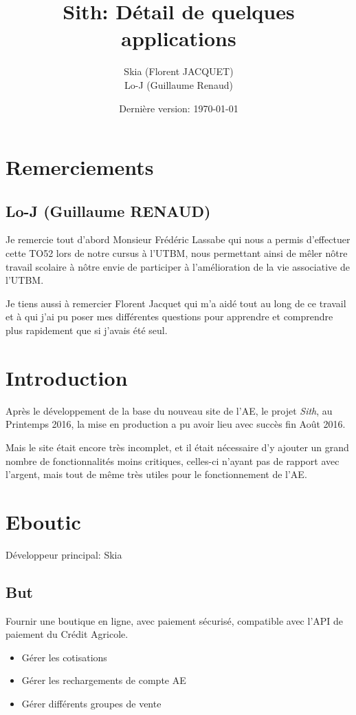 \documentclass[a4paper]{report}
\title{Sith: Détail de quelques applications}
\author{Skia (Florent JACQUET)\\
Lo-J (Guillaume Renaud)}
\date{Dernière version: \today}
\begin{document}
\maketitle

\tableofcontents

\chapter*{Remerciements}
\section*{Lo-J (Guillaume RENAUD)}
\par Je remercie tout d’abord Monsieur Frédéric Lassabe qui nous a permis d’effectuer cette TO52 lors de notre cursus à l’UTBM, nous permettant ainsi de mêler nôtre travail scolaire à nôtre envie de participer à l’amélioration de la vie associative de l’UTBM.

\par Je tiens aussi à remercier Florent Jacquet qui m’a aidé tout au long de ce travail et à qui j’ai pu poser mes différentes questions pour apprendre et comprendre plus rapidement que si j’avais été seul.


\chapter{Introduction}
\par Après le développement de la base du nouveau site de l'AE, le projet \emph{Sith}, au Printemps 2016, la mise en
production a pu avoir lieu avec succès fin Août 2016.

\par Mais le site était encore très incomplet, et il était nécessaire d'y ajouter un grand nombre de fonctionnalités
moins critiques, celles-ci n'ayant pas de rapport avec l'argent, mais tout de même très utiles pour le fonctionnement
de l'AE.

\chapter{Eboutic}
\label{sec:eboutic}
\par Développeur principal: Skia

\section{But}
\label{sub:but}
\par Fournir une boutique en ligne, avec paiement sécurisé, compatible avec l'API de paiement du Crédit Agricole.
\begin{itemize}
    \item Gérer les cotisations
    \item Gérer les rechargements de compte AE
    \item Gérer différents groupes de vente
\end{itemize}
\end{document}
